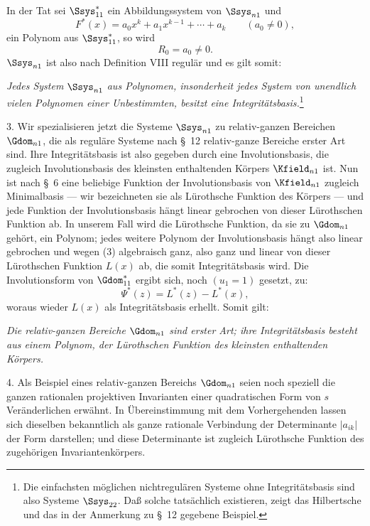 \documentclass[11pt]{article}
\begin{document}
In der Tat sei $\Ssys^*_{11}$ ein Abbildungssystem von $\Ssys_{n1}$ und
\[
  F^*(x)=a_0x^k+a_1x^{k-1}+\cdots+a_k\qquad(a_0\ne0),
\]
ein Polynom aus $\Ssys^*_{11}$, so wird
\begin{equation}
  R_0=a_0\ne0.
\tag{3}
\end{equation}
$\Ssys_{n1}$ ist also nach Definition VIII regulär und es gilt somit:

\emph{Jedes System $\Ssys_{n1}$ aus Polynomen, insonderheit jedes System von unendlich vielen Polynomen einer Unbestimmten, besitzt eine Integritätsbasis.}\footnote{Die einfachsten möglichen nichtregulären Systeme ohne Integritätsbasis sind also Systeme $\Ssys_{22}$. Daß solche tatsächlich existieren, zeigt das Hilbertsche und das in der Anmerkung zu \S\ 12 gegebene Beispiel.}

3. Wir spezialisieren jetzt die Systeme $\Ssys_{n1}$ zu relativ-ganzen Bereichen $\Gdom_{n1}$, die als reguläre Systeme nach \S\ 12 relativ-ganze Bereiche erster Art sind. Ihre Integritätsbasis ist also gegeben durch eine Involutionsbasis, die zugleich Involutionsbasis des kleinsten enthaltenden Körpers $\Kfield_{n1}$ ist. Nun ist nach \S\ 6 eine beliebige Funktion der Involutionsbasis von $\Kfield_{n1}$ zugleich Minimalbasis --- wir bezeichneten sie als Lürothsche Funktion des Körpers --- und jede Funktion der Involutionsbasis hängt linear gebrochen von dieser Lürothschen Funktion ab. In unserem Fall wird die Lürothsche Funktion, da sie zu $\Gdom_{n1}$ gehört, ein Polynom; jedes weitere Polynom der Involutionsbasis hängt also linear gebrochen und wegen (3) algebraisch ganz, also ganz und linear von dieser Lürothschen Funktion $L(x)$ ab, die somit Integritätsbasis wird. Die Involutionsform von $\Gdom^*_{11}$ ergibt sich, noch $(u_1=1)$ gesetzt, zu:
\[
  \Psi^*(z)=L^*(z)-L^*(x),
\]
woraus wieder $L(x)$ als Integritätsbasis erhellt. Somit gilt:

\emph{Die relativ-ganzen Bereiche $\Gdom_{n1}$ sind erster Art; ihre Integritätsbasis besteht aus einem Polynom, der Lürothschen Funktion des kleinsten enthaltenden Körpers.}

4. Als Beispiel eines relativ-ganzen Bereichs $\Gdom_{n1}$ seien noch speziell die ganzen rationalen projektiven Invarianten einer quadratischen Form von $s$ Veränderlichen erwähnt. In Übereinstimmung mit dem Vorhergehenden lassen sich dieselben bekanntlich als ganze rationale Verbindung der Determinante $|a_{ik}|$ der Form darstellen; und diese Determinante ist zugleich Lürothsche Funktion des zugehörigen Invariantenkörpers.
\end{document}
